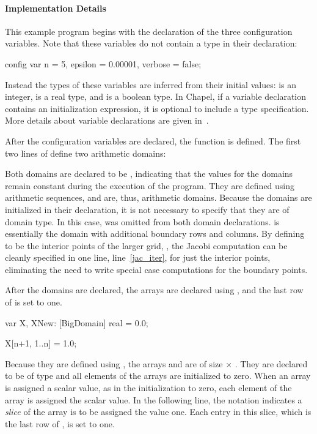 \paragraph{Implementation Details}
This example program begins with the declaration of the three configuration
variables.  Note that these variables do not contain a type in their declaration: 
\begin{chapel}
config var n = 5,
           epsilon = 0.00001,
           verbose = false;
\end{chapel}
Instead the types of these variables are inferred  
from their initial values:  is an integer,  is a real
type, and  is a boolean type.  In Chapel, if a variable declaration
contains an initialization expression, it is optional to include a type specification.
More details about variable declarations are given in~.

After the configuration variables are declared, the  function
is defined.  The first two lines of  define two arithmetic domains:
\begin{chapel}
def main() {                       
  const ProblemSpace = [1..n, 1..n],
        BigDomain = [0..n+1, 0..n+1];
\end{chapel}
Both domains are declared to be , indicating
that the values for the domains remain constant during the execution of
the program.  They are defined using arithmetic sequences, and are, thus,
arithmetic domains.  Because the domains are initialized in their declaration,
it is not necessary to specify that they are of domain type.  In this case,
 was omitted from both domain declarations.  
 is essentially the  
domain with additional 
boundary rows and columns.  By defining  to be the interior
points of the larger grid, , the Jacobi computation can be cleanly 
specified in one line, line~\ref{jac_iter}, for just the interior points, 
eliminating the need to write special case computations for the boundary points.

After the domains are declared, the arrays are declared using ,
and the last row of  is set to one.
\begin{chapel}
  var X, XNew: [BigDomain] real = 0.0;

  X[n+1, 1..n] = 1.0;
\end{chapel}
Because they are defined using , the
arrays  and  are of size  $\times$ .  
They are declared to be of type  and all elements of the arrays
are initialized to zero.  When an array is assigned a scalar value, as in the
initialization to zero, each element of the array is assigned
 the scalar value.  
In the following line, the notation  indicates a {\em slice}
of the array  is to be assigned the value one.  Each entry in this slice,
which is the last row of , is set to one.

